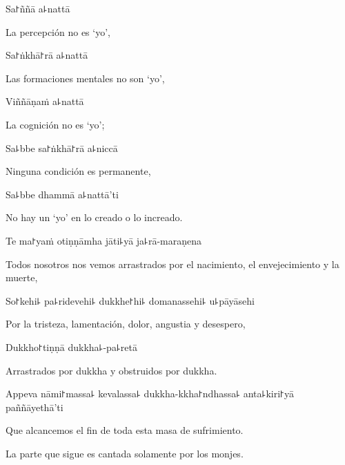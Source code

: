 Sa꜓ññā a꜕nattā

\begin{english}
  La percepción no es ‘yo’,
\end{english}

Sa꜓ṅkhā꜓rā a꜕nattā

\begin{english}
  Las formaciones mentales no son ‘yo’,
\end{english}

Viññāṇaṁ a꜕nattā

\begin{english}
  La cognición no es ‘yo’;
\end{english}

Sa꜕bbe sa꜓ṅkhā꜓rā a꜕niccā

\begin{english}
  Ninguna condición es permanente,
\end{english}

Sa꜕bbe dhammā a꜕nattā'ti

\begin{english}
  No hay un ‘yo’ en lo creado o lo increado.
\end{english}

\clearpage

Te ma꜓yaṁ otiṇṇāmha jāti꜕yā ja꜕rā-maraṇena

\begin{english}
  Todos nosotros nos vemos arrastrados por el nacimiento, el envejecimiento y la muerte,
\end{english}

So꜓kehi꜕ pa꜕ridevehi꜕ dukkhe꜓hi꜕ domanassehi꜕ u꜕pāyāsehi

\begin{english}
  Por la tristeza, lamentación, dolor, angustia y desespero,
\end{english}

Dukkho꜓tiṇṇā dukkha꜕-pa꜕retā

\begin{english}
  Arrastrados por dukkha y obstruidos por dukkha.
\end{english}

Appeva nāmi꜓massa꜕ kevalassa꜕ dukkha-kkha꜓ndhassa꜕ anta꜕kiri꜓yā \\paññāyethā'ti

\begin{english}
  Que alcancemos el fin de toda esta masa de sufrimiento.
\end{english}

\begin{instruction}
  La parte que sigue es cantada solamente por los monjes.
\end{instruction}

